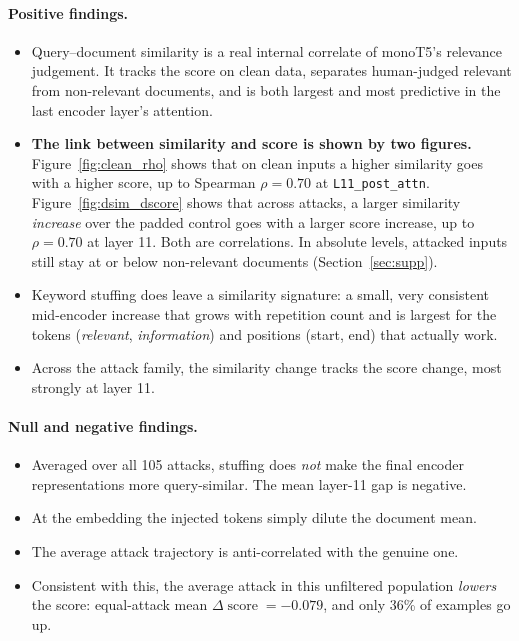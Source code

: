 \documentclass[11pt]{article}
\newcommand{\score}{\operatorname{score}}
\begin{document}
\paragraph{Positive findings.}
\begin{itemize}[nosep]
  \item Query--document similarity is a real internal correlate of monoT5's relevance
        judgement. It tracks the score on clean data, separates human-judged relevant
        from non-relevant documents, and is both largest and most predictive in the
        last encoder layer's attention.
  \item \textbf{The link between similarity and score is shown by two figures.}
        Figure~\ref{fig:clean_rho} shows that on clean inputs a higher similarity
        goes with a higher score, up to Spearman $\rho=0.70$ at \texttt{L11\_post\_attn}.
        Figure~\ref{fig:dsim_dscore} shows that across attacks, a larger similarity
        \emph{increase} over the padded control goes with a larger score increase,
        up to $\rho=0.70$ at layer 11. Both are correlations. In absolute levels,
        attacked inputs still stay at or below non-relevant documents
        (Section~\ref{sec:supp}).
  \item Keyword stuffing does leave a similarity signature: a small, very consistent
        mid-encoder increase that grows with repetition count and is largest for the
        tokens (\emph{relevant}, \emph{information}) and positions (start, end) that
        actually work.
  \item Across the attack family, the similarity change tracks the score change,
        most strongly at layer 11.
\end{itemize}

\paragraph{Null and negative findings.}
\begin{itemize}[nosep]
  \item Averaged over all 105 attacks, stuffing does \emph{not} make the final encoder
        representations more query-similar. The mean layer-11 gap is negative.
  \item At the embedding the injected tokens simply dilute the document mean.
  \item The average attack trajectory is anti-correlated with the genuine one.
  \item Consistent with this, the average attack in this unfiltered population
        \emph{lowers} the score: equal-attack mean $\Delta\score=-0.079$, and only 36\%
        of examples go up.
\end{itemize}
\end{document}
